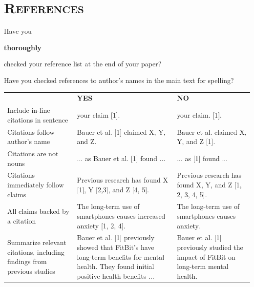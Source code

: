 \documentclass[12pt]{article} %
\begin{document}
\noindent\makebox[\linewidth]{\rule{\linewidth}{0.4pt}}
\section*{\textsc{References}}
\vspace{0.5cm}

\begin{checklist}
	\item Have you \begin{em}\textbf{thoroughly}\end{em} checked your reference list at the end of your paper?
	\item Have you checked references to author's names in the main text for spelling?
\end{checklist}

\begin{center}

\small %
\def\arraystretch{2}
\begin{tabular}{p{6cm} p{5cm} p{5cm}}
& \textbf{YES} & \textbf{NO} \\
 \cmidrule{2-2}  \cmidrule{3-3} 
Include in-line citations in sentence & your claim [1]. & your claim. [1]. \\
Citations follow author's name & Bauer et al. [1] claimed X, Y, and Z. & Bauer et al. claimed X, Y, and Z [1]. \\
Citations are not nouns & ... as Bauer et al. [1] found ... & ... as [1] found ... \\
Citations immediately follow claims & Previous research has found X [1], Y [2,3], and Z [4, 5]. &  Previous research has found X, Y, and Z [1, 2, 3, 4, 5]. \\
All claims backed by a citation & The long-term use of smartphones causes increased anxiety [1, 2, 4]. & The long-term use of smartphones causes anxiety.  \\
Summarize relevant citations, including findings from previous studies & Bauer et al. [1] previously showed that FitBit's have long-term benefits for mental health. They found initial positive health benefits ... & Bauer et al. [1] previously studied the impact of FitBit on long-term mental health. \\
\end{tabular}
\end{center}
\end{document}
